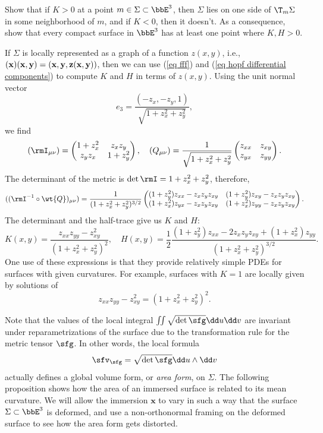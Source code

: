 \begin{xca}
    Show that if $K>0$ at a point $m\in \Sigma\subset \bbE^3$, then $\Sigma$ lies on one side of $\T_m\Sigma$ in some neighborhood of $m$, and if $K<0$, then it doesn't. As a consequence, show that every compact surface in $\bbE^3$ has at least one point where $K,H>0$.
\end{xca}

\begin{rem}
    If $\Sigma$ is locally represented as a graph of a function $z(x,y)$, i.e., $\bf(x)(x,y)=(x,y,z(x,y))$, then we can use (\ref{eq fff}) and (\ref{eq hopf differential components}) to compute $K$ and $H$ in terms of $z(x,y)$. Using the unit normal vector 
    \[e_3=\frac{(-z_x,-z_y,1)}{\sqrt{1+z_x^2+z_y^2}},\]
    we find
    \[(\rmI_{\mu\nu})= \begin{pmatrix}
        1+z_x^2 & z_xz_y\\
        z_y z_x & 1+z_y^2
    \end{pmatrix},\quad 
    (Q_{\mu\nu})=
    \frac{1}{\sqrt{1+z_x^2+z_y^2}}
    \begin{pmatrix}
        z_{xx} & z_{xy}\\
        z_{yx} & z_{yy}
    \end{pmatrix}.\]
    The determinant of the metric is $\det\rmI=1+z_x^2+z_y^2$, therefore,
    \[((\rmI^{-1}\circ \wt{Q})_{\mu\nu})=
    \frac{1}{(1+z_x^2+z_y^2)^{3/2}}
    \begin{pmatrix}
        (1+z_y^2)z_{xx}-z_xz_yz_{xy} & (1+z_y^2)z_{xy}-z_xz_yz_{xy}\\
        (1+z_x^2)z_{yx}-z_xz_yz_{xy} & (1+z_x^2)z_{yy}-z_xz_yz_{xy}
    \end{pmatrix}.
    \]
    The determinant and the half-trace give us $K$ and $H$:
    \[K(x,y)=\frac{z_{xx}z_{yy}-z_{xy}^2}{(1+z_x^2+z_y^2)^2},\quad 
    H(x,y)=\frac{1}{2}\frac{(1+z_y^2)z_{xx}-2z_xz_yz_{xy}+(1+z_x^2)z_{yy}}{(1+z_x^2+z_y^2)^{3/2}}.\label{eq local formulas for K and H}
    \]
    One use of these expressions is that they provide relatively simple PDEs for surfaces with given curvatures. For example, surfaces with $K=1$ are locally given by solutions of 
    \[z_{xx}z_{yy}-z_{xy}^2=(1+z_x^2+z_y^2)^2.\label{eq 1.4 Ivey}\]
\end{rem}


Note that the values of the local integral $\iint \sqrt{\det \sfg}\dd u\dd v$ are invariant under reparametrizations of the surface due to the transformation rule for the metric tensor $\sfg$. In other words, the local formula 
\[\sfv_{\sfg}=\sqrt{\det\sfg}\dd u\wedge\dd v\]
actually defines a global volume form, or \emph{area form}, on $\Sigma$. The following proposition shows how the area of an immersed surface is related to its mean curvature. We will allow the immersion $\bm{x}$ to vary in such a way that the surface $\Sigma\subset\bbE^3$ is deformed, and use a non-orthonormal framing on the deformed surface to see how the area form gets distorted.

